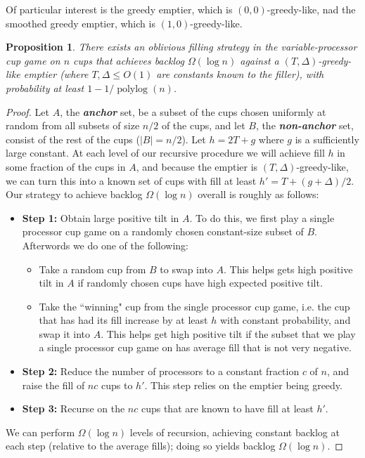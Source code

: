 \documentclass[twocolumn]{article}[10pt]
\newcommand{\defn}[1]{{\textit{\textbf{\boldmath #1}}}\xspace}
\DeclareMathOperator{\polylog}{\text{polylog}}
\newtheorem{proposition}{Proposition}
\begin{document}
Of particular interest is the greedy emptier, which is $(0,0)$-greedy-like, nad
the smoothed greedy emptier, which is $(1, 0)$-greedy-like.

\begin{proposition}
  \label{prop:obliviousBase}
  There exists an oblivious filling strategy in the variable-processor cup game
  on $n$ cups that achieves backlog $\Omega(\log n)$ against a $(T,
  \Delta)$-greedy-like emptier (where $T, \Delta \le O(1)$ are constants
  known to the filler), with probability at least $1-1/\polylog(n)$.
\end{proposition}
\begin{proof}
  Let $A$, the \defn{anchor} set, be a subset of the cups chosen uniformly at
  random from all subsets of size $n/2$ of the cups, and let $B$, the
  \defn{non-anchor} set, consist of the rest of the cups ($|B| = n/2$). Let $h
  = 2 T + g $ where $g$ is a sufficiently large constant. At each level of our
  recursive procedure we will achieve fill $h$ in some fraction of the cups in
  $A$, and because the emptier is $(T, \Delta)$-greedy-like, we can turn this
  into a known set of cups with fill at least $h' = T + (g+\Delta)/2$. Our
  strategy to achieve backlog $\Omega(\log n)$ overall is roughly as follows:
  \begin{itemize}
    \item \textbf{Step 1:} 
      Obtain large positive tilt in $A$. To do this, we first play a single
      processor cup game on a randomly chosen constant-size subset of $B$.
      Afterwords we do one of the following:
      \begin{itemize}
        \item Take a random cup from $B$ to swap into $A$. This helps gets high
          positive tilt in $A$ if randomly chosen cups have high expected
          positive tilt.
        \item Take the ``winning" cup from the single processor cup game, i.e.
          the cup that has had its fill increase by at least $h$ with constant
          probability, and swap it into $A$. This helps get high positive tilt
          if the subset that we play a single processor cup game on has average
          fill that is not very negative.
      \end{itemize}
  \item \textbf{Step 2:} Reduce the number of processors to a constant fraction
    $c$ of $n$, and raise the fill of $nc$ cups to $h'$. This step relies on
    the emptier being greedy.
  \item \textbf{Step 3:} Recurse on the $nc$ cups that are known to have fill
    at least $h'$.
\end{itemize}
We can perform $\Omega(\log n)$ levels of recursion, achieving constant backlog
at each step (relative to the average fills); doing so yields backlog
$\Omega(\log n)$.


\end{proof}
\end{document}
